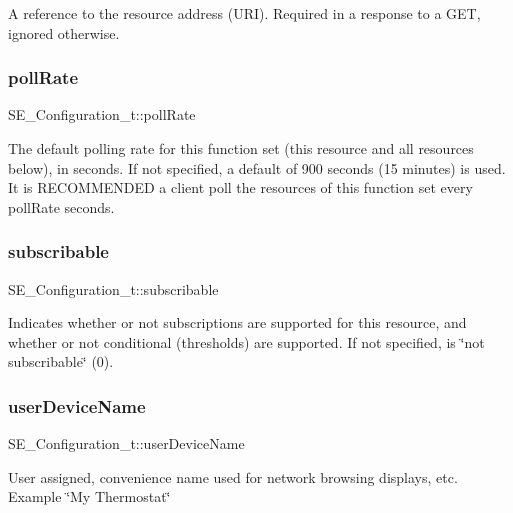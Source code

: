 A reference to the resource address (U\+RI). Required in a response to a G\+ET, ignored otherwise. \mbox{\label{group__Configuration_gab33fe4f10250aa426acb5e134ab4cc0c}} 
\subsubsection{\texorpdfstring{poll\+Rate}{pollRate}}
{\footnotesize\ttfamily S\+E\+\_\+\+Configuration\+\_\+t\+::poll\+Rate}

The default polling rate for this function set (this resource and all resources below), in seconds. If not specified, a default of 900 seconds (15 minutes) is used. It is R\+E\+C\+O\+M\+M\+E\+N\+D\+ED a client poll the resources of this function set every poll\+Rate seconds. \mbox{\label{group__Configuration_ga314f37faa263874665349279e360400d}} 
\subsubsection{\texorpdfstring{subscribable}{subscribable}}
{\footnotesize\ttfamily S\+E\+\_\+\+Configuration\+\_\+t\+::subscribable}

Indicates whether or not subscriptions are supported for this resource, and whether or not conditional (thresholds) are supported. If not specified, is \char`\"{}not subscribable\char`\"{} (0). \mbox{\label{group__Configuration_gae6dff21a0f541f054b5b0c53ea90b621}} 
\subsubsection{\texorpdfstring{user\+Device\+Name}{userDeviceName}}
{\footnotesize\ttfamily S\+E\+\_\+\+Configuration\+\_\+t\+::user\+Device\+Name}

User assigned, convenience name used for network browsing displays, etc. Example \char`\"{}\+My Thermostat\char`\"{} 